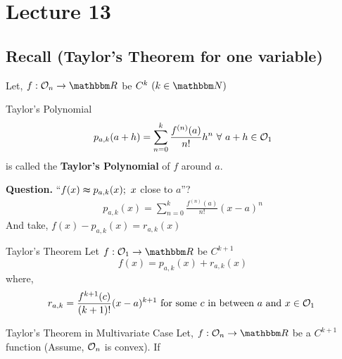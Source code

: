 \documentclass[../Analysis-3]{subfiles}
\begin{document}
\chapter*{Lecture 13} %
\setcounter{chapter}{13} %
\setcounter{section}{0}

\section{Recall (Taylor's Theorem for one variable)}

Let, $ f : \Op{n} \to \R $ be $C^k \ (k \in \N)$

\begin{Def}{Taylor's Polynomial}{}
    \[ p_{a,k}(a+h) = \sum_{n = 0}^{k} \frac{f^{(n)}(a)}{n!} h^{n} \ \forall\ a+h \in \mathcal{O}_{1} \]
    is called the \textbf{Taylor's Polynomial} of $f$ around $a$.
\end{Def}

\textbf{Question.} ``$f(x) \thickapprox  p_{a,k}(x);\ x$ close to $a$''?
\begin{align*}
    p_{a,k}(x) = \sum_{n = 0}^{k} \frac{f^{(n)}(a)}{n!} (x-a)^{n}
\end{align*}
And take, $f(x) - p_{a,k}(x) = r_{a,k}(x)$

\begin{Thm}{Taylor's Theorem}{}
    Let $ f: \Op{1} \to \R $ be $C^{k+1}$
    \[ f(x) = p_{a,k}(x) + r_{a,k}(x) \]
    where, \[r_{a,k} = \frac{f^{k+1}(c)}{(k+1)!} (x-a)^{k+1} \ \text{for some $c$ in between $a$ and $x \in \mathcal{O}_{1}$ }\]
\end{Thm}

\begin{Thm}{Taylor's Theorem in Multivariate Case}{}
    Let, $ f: \Op{n} \to \R $ be a $C^{k+1}$ function (Assume, $\mathcal{O}_{n}$ is convex). If
\end{Thm}
\end{document}
